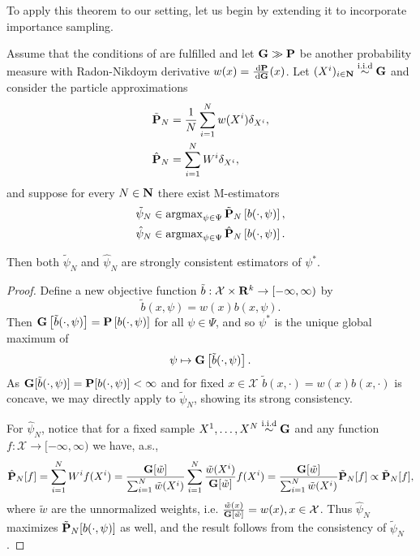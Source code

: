 To apply this theorem to our setting, let us begin by extending it to incorporate importance sampling. 

\begin{proposition}
    \label{prop:is-consistency}
    Assume that the conditions of  are fulfilled and let $\G \gg \P$ be another probability measure with Radon-Nikdoym derivative $w(x) = \rnd{\P}{\G}(x)$. 
    Let $(X^{i})_{i \in \N} \iid \G$ and consider the particle approximations 
    \begin{align*}
        \tilde \P_{N} &= \frac{1}{N}\sum_{i = 1}^N w(X^{i})\delta_{X^{i}},  \\ 
        \hat \P_{N} &= \sum_{i = 1}^{N} W^{i} \delta_{X^{i}},
    \end{align*}
    and suppose for every $N\in\N$ there exist M-estimators
    \begin{align*}
    \tilde \psi_{N} &\in \argmax_{\psi \in \Psi} \tilde \P _{N} \left[ b(\cdot, \psi) \right],\\
    \hat \psi_{N} &\in \argmax_{\psi \in \Psi} \hat \P _{N} \left[ b(\cdot, \psi) \right].
    \end{align*}

    Then both $\tilde\psi_{N}$ and $\hat\psi_{N}$ are strongly consistent estimators of $\psi^{\ast}$.
\end{proposition}
\begin{proof}
    Define a new objective function $\tilde b : \mathcal X \times \R^{k} \to [-\infty, \infty)$ by 
    $$
    \tilde b(x, \psi) = w(x) b(x, \psi).
    $$
    Then $\G \left[ \tilde b(\cdot, \psi) \right] = \P \left[ b(\cdot, \psi) \right]$ for all $\psi\in\Psi$, and so $\psi^{\ast}$ is the unique global maximum of $$\psi \mapsto \G \left[ \tilde b(\cdot, \psi) \right].$$ 
    As $\G [\tilde b(\cdot, \psi)] = \P [b(\cdot, \psi)] < \infty$ and for fixed $x\in\mathcal X$ $\tilde b(x, \cdot) = w(x)b(x,\cdot)$ is concave, we may directly apply  to $\tilde\psi_{N}$, showing its strong consistency.

    For $\hat\psi_{N}$, notice that for a fixed sample $X^{1}, \dots, X^{N} \iid \G$ and any function $f: \mathcal X \to [-\infty, \infty)$ we have, a.s., 
    $$
        \hat \P _{N} [f] = \sum_{i = 1}^{N} W^{i} f(X^{i}) = \frac{\G [\tilde w]}{\sum_{i = 1}^N \tilde w(X^{i})} \sum_{i = 1}^{N} \frac{\tilde w(X^{i})}{\G[\tilde w]} f(X^{i}) = \frac{\G [\tilde w]}{\sum_{i = 1}^{N} \tilde w(X^{i})} \tilde \P _{N} [f] \propto \tilde \P_{N} [f],
    $$
    where $\tilde w$ are the unnormalized weights, i.e. $ \frac{\tilde w(x)}{\G [\tilde w]} = w(x), x \in\mathcal X$.
    Thus $\hat \psi_{N}$ maximizes $\tilde \P_{N} [b(\cdot, \psi)]$ as well, and the result follows from the consistency of $\tilde \psi_{N}$.
\end{proof}

